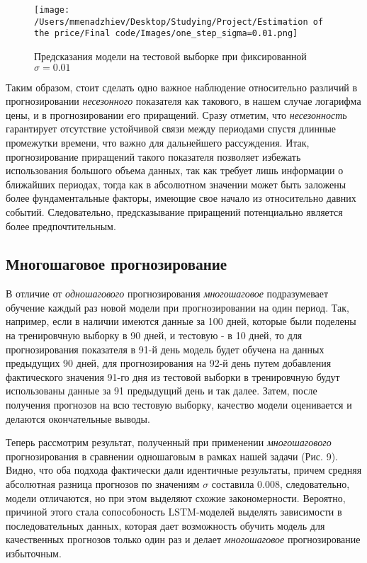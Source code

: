 \begin{figure}[H]
    \centering
    \texttt{[image: /Users/mmenadzhiev/Desktop/Studying/Project/Estimation of the price/Final code/Images/one\_step\_sigma=0.01.png]}
    \caption{Предсказания модели на тестовой выборке при фиксированной $\sigma = 0.01$}
\end{figure}

Таким образом, стоит сделать одно важное наблюдение относительно различий в прогнозировании \textit{несезонного} показателя как такового, в нашем случае логарифма цены, и в прогнозировании его приращений. Сразу отметим, что \textit{несезонность} гарантирует отсутствие устойчивой связи между периодами спустя длинные промежутки времени, что важно для дальнейшего рассуждения. Итак, прогнозирование приращений такого показателя позволяет избежать использования большого объема данных, так как требует лишь информации о ближайших периодах, тогда как в абсолютном значении может быть заложены более фундаментальные факторы, имеющие свое начало из относительно давних событий. Следовательно, предсказывание приращений потенциально является более предпочтительным.

\subsection{Многошаговое прогнозирование}

В отличие от \textit{одношагового} прогнозирования \textit{многошаговое} подразумевает обучение каждый раз новой модели при прогнозировании на один период. Так, например, если в наличии имеются данные за 100 дней, которые были поделены на тренировчную выборку в 90 дней, и тестовую - в 10 дней, то для прогнозирования показателя в 91-й день модель будет обучена на данных предыдущих 90 дней, для прогнозирования на 92-й день путем добавления фактического значения 91-го дня из тестовой выборки в тренировчную будут использованы данные за 91 предыдущий день и так далее. Затем, после получения прогнозов на всю тестовую выборку, качество модели оценивается и делаются окончательные выводы.

Теперь рассмотрим результат, полученный при применении \textit{многошагового} прогнозирования в сравнении одношаговым в рамках нашей задачи (Рис. 9). Видно, что оба подхода фактически дали идентичные результаты, причем средняя абсолютная разница прогнозов по значениям $\sigma$ составила $0.008$, следовательно, модели отличаются, но при этом выделяют схожие закономерности. Вероятно, причиной этого стала сопособоность LSTM-моделей выделять зависимости в последовательных данных, которая дает возможность обучить модель для качественных прогнозов только один раз и делает \textit{многошаговое} прогнозирование избыточным.

